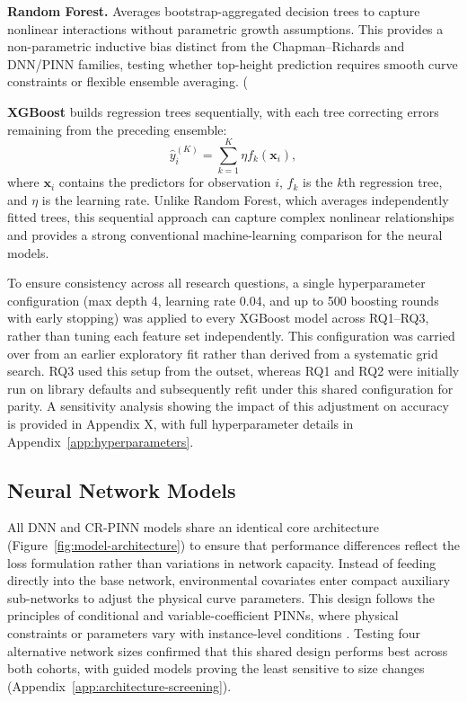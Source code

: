 \textbf{Random Forest.} Averages bootstrap-aggregated decision trees to capture nonlinear interactions without parametric growth assumptions. This provides a non-parametric inductive bias distinct from the Chapman--Richards and DNN/PINN families, testing whether top-height prediction requires smooth curve constraints or flexible ensemble averaging. (%

\textbf{XGBoost} builds regression trees sequentially, with each tree correcting errors remaining from the preceding ensemble:
\begin{equation}
\hat{y}_i^{(K)} = \sum_{k=1}^{K}\eta f_k(\mathbf{x}_i),
\end{equation}
where $\mathbf{x}_i$ contains the predictors for observation $i$, $f_k$ is the $k$th regression tree, and $\eta$ is the learning rate. Unlike Random Forest, which averages independently fitted trees, this sequential approach can capture complex nonlinear relationships and provides a strong conventional machine-learning comparison for the neural models.

To ensure consistency across all research questions, a single hyperparameter configuration (max depth 4, learning rate 0.04, and up to 500 boosting rounds with early stopping) was applied to every XGBoost model across RQ1–RQ3, rather than tuning each feature set independently. This configuration was carried over from an earlier exploratory fit rather than derived from a systematic grid search. RQ3 used this setup from the outset, whereas RQ1 and RQ2 were initially run on library defaults and subsequently refit under this shared configuration for parity. A sensitivity analysis showing the impact of this adjustment on accuracy is provided in Appendix X, with full hyperparameter details in Appendix~\ref{app:hyperparameters}. 

\subsection{Neural Network Models}
All DNN and CR-PINN models share an identical core architecture (Figure~\ref{fig:model-architecture}) to ensure that performance differences reflect the loss formulation rather than variations in network capacity. Instead of feeding directly into the base network, environmental covariates enter compact auxiliary sub-networks to adjust the physical curve parameters. This design follows the principles of conditional and variable-coefficient PINNs, where physical constraints or parameters vary with instance-level conditions \citep{kovacs2022Conditional_C4_NN,miao2023VCPINN_C4_NN}. Testing four alternative network sizes confirmed that this shared design performs best across both cohorts, with guided models proving the least sensitive to size changes (Appendix~\ref{app:architecture-screening}).

